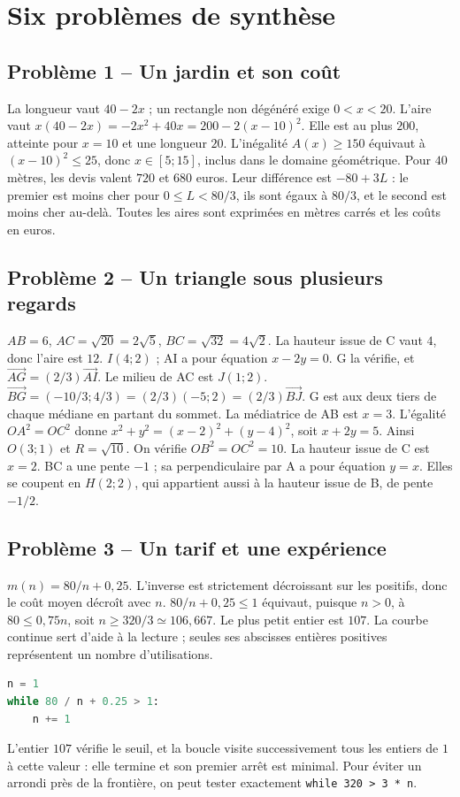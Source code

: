 \chapter{Six problèmes de synthèse}
\section*{Problème 1 -- Un jardin et son coût}
La longueur vaut $40-2x$ ; un rectangle non dégénéré exige $0<x<20$. L'aire vaut $x(40-2x)=-2x^2+40x=200-2(x-10)^2$. Elle est au plus $200$, atteinte pour $x=10$ et une longueur $20$.
L'inégalité $A(x)\ge150$ équivaut à $(x-10)^2\le25$, donc $x\in[5;15]$, inclus dans le domaine géométrique.
Pour $40$ mètres, les devis valent $720$ et $680$ euros. Leur différence est $-80+3L$ : le premier est moins cher pour $0\le L<80/3$, ils sont égaux à $80/3$, et le second est moins cher au-delà. Toutes les aires sont exprimées en mètres carrés et les coûts en euros.

\section*{Problème 2 -- Un triangle sous plusieurs regards}
$AB=6$, $AC=\sqrt{20}=2\sqrt5$, $BC=\sqrt{32}=4\sqrt2$. La hauteur issue de C vaut $4$, donc l'aire est $12$.
$I(4;2)$ ; AI a pour équation $x-2y=0$. G la vérifie, et $\overrightarrow{AG}=(2/3)\overrightarrow{AI}$.
Le milieu de AC est $J(1;2)$. $\overrightarrow{BG}=(-10/3;4/3)=(2/3)(-5;2)=(2/3)\overrightarrow{BJ}$. G est aux deux tiers de chaque médiane en partant du sommet.
La médiatrice de AB est $x=3$. L'égalité $OA^2=OC^2$ donne $x^2+y^2=(x-2)^2+(y-4)^2$, soit $x+2y=5$. Ainsi $O(3;1)$ et $R=\sqrt{10}$. On vérifie $OB^2=OC^2=10$.
La hauteur issue de C est $x=2$. BC a une pente $-1$ ; sa perpendiculaire par A a pour équation $y=x$. Elles se coupent en $H(2;2)$, qui appartient aussi à la hauteur issue de B, de pente $-1/2$.

\section*{Problème 3 -- Un tarif et une expérience}
$m(n)=80/n+0{,}25$. L'inverse est strictement décroissant sur les positifs, donc le coût moyen décroît avec $n$.
$80/n+0{,}25\le1$ équivaut, puisque $n>0$, à $80\le0{,}75n$, soit $n\ge320/3\simeq106{,}667$. Le plus petit entier est $107$. La courbe continue sert d'aide à la lecture ; seules ses abscisses entières positives représentent un nombre d'utilisations.
\begin{lstlisting}[language=Python]
n = 1
while 80 / n + 0.25 > 1:
    n += 1
\end{lstlisting}
L'entier $107$ vérifie le seuil, et la boucle visite successivement tous les entiers de $1$ à cette valeur : elle termine et son premier arrêt est minimal. Pour éviter un arrondi près de la frontière, on peut tester exactement \texttt{while 320 > 3 * n}.

